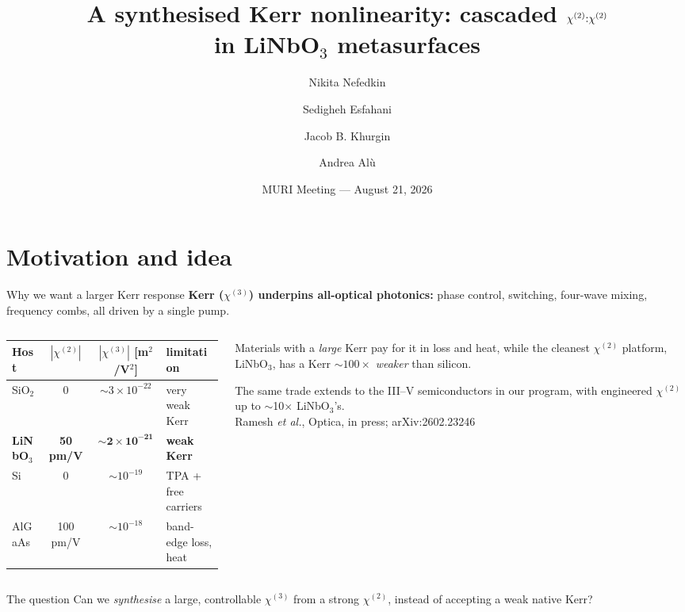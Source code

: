 \documentclass[aspectratio=169,10pt]{beamer}
\title{A synthesised Kerr nonlinearity: cascaded $\chitwo{:}\chitwo$ \\ in LiNbO$_3$ metasurfaces}
\author{Nikita Nefedkin\inst{1} \and Sedigheh Esfahani\inst{1} \and
        Jacob B. Khurgin\inst{2} \and Andrea Al\`u\inst{1}}
\institute{\inst{1}Photonics Initiative, Advanced Science Research Center,
           City University of New York \\
           \inst{2}Department of Electrical and Computer Engineering,
           Johns Hopkins University \\[6pt]
       }
\date{MURI Meeting --- August 21, 2026}
\newcommand{\chitwo}{\chi^{(2)}}
\newcommand{\chithree}{\chi^{(3)}}
\begin{document}
\maketitle

\section{Motivation and idea}

\begin{frame}{Why we want a larger Kerr response}
  \textbf{Kerr ($\chithree$) underpins all-optical photonics:} phase control,
  switching, four-wave mixing, frequency combs, all driven by a single pump.
  \vspace{4pt}
  \begin{columns}[T]
    \begin{column}{0.56\linewidth}
      \footnotesize
      \begin{table}
      \begin{tabular}{@{}lccl@{}}
        \toprule
        Host & $|\chitwo|$ & $|\chithree|$ [m$^2$/V$^2$] & limitation \\
        \midrule
        SiO$_2$   & 0 & $\sim\!3\times10^{-22}$ & very weak Kerr \\
        \textbf{LiNbO$_3$} & \textbf{50 pm/V} & $\bm{\sim\!2\times10^{-21}}$ & \textbf{weak Kerr} \\
        Si        & 0 & $\sim\!10^{-19}$ & TPA + free carriers \\
        AlGaAs    & 100 pm/V & $\sim\!10^{-18}$ & band-edge loss, heat \\
        \bottomrule
      \end{tabular}
      \end{table}
    \end{column}
    \begin{column}{0.4\linewidth}
      \small
      Materials with a \emph{large} Kerr pay for it in loss and heat, while the
      cleanest $\chitwo$ platform, LiNbO$_3$, has a Kerr $\sim\!100\times$
      \emph{weaker} than silicon.
      \vspace{3pt}

      The same trade extends to the III--V semiconductors in our program, with
      engineered $\chitwo$ up to $\sim$10$\times$ LiNbO$_3$'s.
      \\[1pt]
      {\tiny\color{gray} Ramesh \emph{et al.}, Optica, in press; arXiv:2602.23246}
    \end{column}
  \end{columns}
  \vspace{6pt}
  \begin{alertblock}{The question}
    Can we \emph{synthesise} a large, controllable $\chithree$ from a strong
    $\chitwo$, instead of accepting a weak native Kerr?
  \end{alertblock}
\end{frame}
\end{document}
